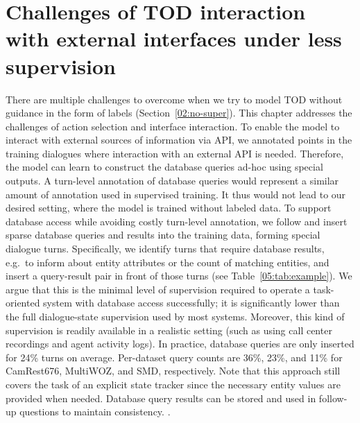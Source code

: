 \section{Challenges of TOD interaction with external interfaces under less supervision}
\label{05:sec:to-unsup}
There are multiple challenges to overcome when we try to model TOD without guidance in the form of labels (Section~\ref{02:no-super}).
This chapter addresses the challenges of action selection and interface interaction.
To enable the model to interact with external sources of information via API, we annotated points in the training dialogues where interaction with an external API is needed.
Therefore, the model can learn to construct the database queries ad-hoc using special outputs.
A turn-level annotation of database queries would represent a similar amount of annotation used in supervised training. It thus would not lead to our desired setting, where the model is trained without labeled data.
To support database access while avoiding costly turn-level annotation, we follow \citet{bordes2016learning} and 
insert sparse database queries and results into the training data, forming special dialogue turns.
Specifically, we identify turns that require database results, e.g.\ to inform about entity attributes or the count of matching entities, and insert a query-result pair in front of those turns (see Table~\ref{05:tab:example}). We argue that this is the minimal level of supervision required to operate a task-oriented system with database access successfully; it is significantly lower than the full dialogue-state supervision used by most systems.
Moreover, this kind of supervision is readily available in a realistic setting (such as using call center recordings and agent activity logs).
In practice, database queries are only inserted for 24\% turns on average.
Per-dataset query counts are 36\%, 23\%, and 11\% for CamRest676, MultiWOZ, and SMD, respectively.
Note that this approach still covers the task of an explicit state tracker since the necessary entity values are provided when needed.
Database query results can be stored and used in follow-up questions to maintain consistency.
.

